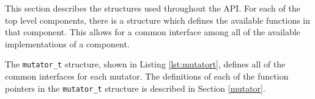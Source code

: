 This section describes the structures used throughout the API.  For each of the
top level components, there is a structure which defines the available functions
in that component.  This allows for a common interface among all of the
available implementations of a component.

\vbox{
}

The \texttt{mutator\_t} structure, shown in Listing \ref{lst:mutatort}, defines
all of the common interfaces for each mutator.  The definitions of each of the
function pointers in the \texttt{mutator\_t} structure is described in Section
\ref{mutator}.
